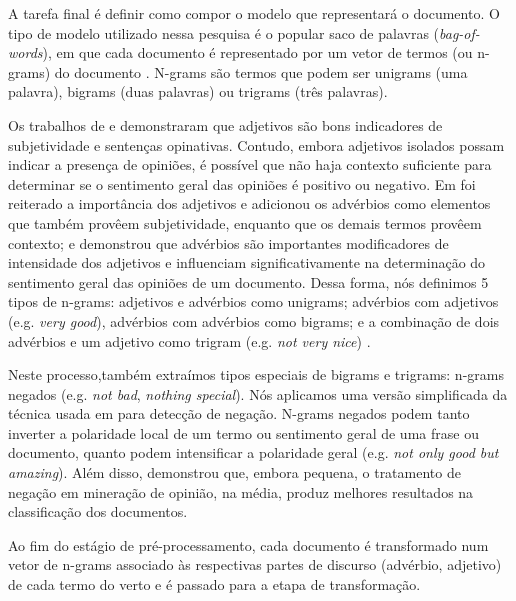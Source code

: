 A tarefa final é definir como compor o modelo que representará o documento. O tipo de modelo utilizado nessa pesquisa é o popular saco de palavras (\textit{bag-of-words}), em que cada documento é representado por um vetor de termos (ou n-grams) do documento \cite{moraes2012document}. N-grams são termos que podem ser unigrams (uma palavra), bigrams (duas palavras) ou trigrams (três palavras). 


Os trabalhos de \cite{hatzivassiloglou2000effects} e \cite{wiebe2000learning} demonstraram que adjetivos são bons indicadores de subjetividade e sentenças opinativas. Contudo, embora adjetivos isolados possam indicar a presença de opiniões, é possível que não haja contexto suficiente para determinar se o sentimento geral das opiniões é positivo ou negativo. Em \cite{chaovalit2005movie} foi reiterado a importância dos adjetivos e adicionou os advérbios como elementos que também provêem subjetividade, enquanto que os demais termos provêem contexto; e \cite{benamara2007sentiment} demonstrou que advérbios são importantes modificadores de intensidade dos adjetivos e influenciam significativamente na determinação do sentimento geral das opiniões de um documento. Dessa forma, nós definimos 5 tipos de n-grams: adjetivos e advérbios como unigrams; advérbios com adjetivos (e.g. \textit{very good}), advérbios com advérbios como bigrams; e a combinação de dois advérbios e um adjetivo como trigram (e.g. \textit{not very nice}) \cite{pang2002thumbs, turney2002thumbs, taboada2008extracting, karamibekr2012verb}. 

Neste processo,também extraímos tipos especiais de bigrams e trigrams:  n-grams negados (e.g. \textit{not bad}, \textit{nothing special}). Nós aplicamos uma versão simplificada da técnica usada em \cite{das2001yahoo} para detecção de negação. N-grams negados podem tanto inverter a polaridade local de um termo ou sentimento geral de uma frase ou documento, quanto podem intensificar a polaridade geral (e.g. \textit{not only good but amazing}). Além disso, \cite{taboada2008extracting} demonstrou que, embora pequena, o tratamento de negação em mineração de opinião, na média, produz melhores resultados na classificação dos documentos. 

Ao fim do estágio de pré-processamento, cada documento é transformado num vetor de n-grams associado às respectivas partes de discurso (advérbio, adjetivo) de cada termo do verto e é passado para a etapa de transformação.  

